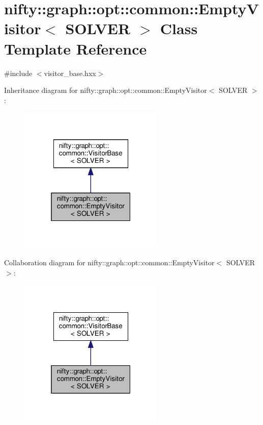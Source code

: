 \hypertarget{classnifty_1_1graph_1_1opt_1_1common_1_1EmptyVisitor}{}\section{nifty\+:\+:graph\+:\+:opt\+:\+:common\+:\+:Empty\+Visitor$<$ S\+O\+L\+V\+ER $>$ Class Template Reference}
\label{classnifty_1_1graph_1_1opt_1_1common_1_1EmptyVisitor}


{\ttfamily \#include $<$visitor\+\_\+base.\+hxx$>$}



Inheritance diagram for nifty\+:\+:graph\+:\+:opt\+:\+:common\+:\+:Empty\+Visitor$<$ S\+O\+L\+V\+ER $>$\+:
\nopagebreak
\begin{figure}[H]
\begin{center}
\leavevmode
\includegraphics[width=196pt]{classnifty_1_1graph_1_1opt_1_1common_1_1EmptyVisitor__inherit__graph}
\end{center}
\end{figure}


Collaboration diagram for nifty\+:\+:graph\+:\+:opt\+:\+:common\+:\+:Empty\+Visitor$<$ S\+O\+L\+V\+ER $>$\+:
\nopagebreak
\begin{figure}[H]
\begin{center}
\leavevmode
\includegraphics[width=196pt]{classnifty_1_1graph_1_1opt_1_1common_1_1EmptyVisitor__coll__graph}
\end{center}
\end{figure}
